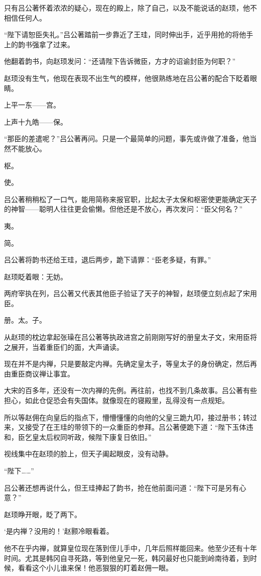 只有吕公著怀着浓浓的疑心，现在的殿上，除了自己，以及不能说话的赵顼，他不相信任何人。

“陛下请恕臣失礼。”吕公著踏前一步靠近了王珪，同时伸出手，近乎用抢的将他手上的韵书强拿了过来。

他翻着韵书，向赵顼发问：“还请陛下告诉微臣，方才的诏谕封臣为何职？”

赵顼没有生气，他现在表现不出生气的模样，他很熟练地在吕公著的配合下眨着眼睛。

上平一东——宫。

上声十九皓——保。

“那臣的差遣呢？”吕公著再问。只是一个最简单的问题，事先或许做了准备，他当然不能放心。

枢。

使。

吕公著稍稍松了一口气，能用简称来报官职，比起太子太保和枢密使更能确定天子的神智——聪明人往往更会偷懒。但他还是不放心，再次发问：“臣父何名？”

夷。

简。

吕公著将韵书还给王珪，退后两步，跪下请罪：“臣老多疑，有罪。”

赵顼眨着眼：无妨。

两府宰执在列，吕公著又代表其他臣子验证了天子的神智，赵顼便立刻点起了宋用臣。

册。太。子。

从赵顼的枕边拿起张璪在吕公著等执政进宫之前刚刚写好的册皇太子文，宋用臣将之展开，当着重臣们的面，大声诵读。

现在并不是内禅，只是要敲定内禅。先确定皇太子，等皇太子的身份确定，然后再由重臣商议禅让事宜。

大宋的百多年，还没有一次内禅的先例。再往前，也找不到几条故事。吕公著有些担心，如此仓促恐会有失国体。就像现在的寝殿里，乱得没有一点规矩。

所以等赵佣在向皇后的指点下，懵懵懂懂的向他的父皇三跪九叩，接过册书；转过来，又接受了在王珪的带领下的一众重臣的参拜。吕公著便跪下道：“陛下玉体违和，臣乞皇太后权同听政，候陛下康复日依旧。”

视线集中在赵顼的脸上，但天子阖起眼皮，没有动静。

“陛下……”

吕公著还想再说什么，但王珪捧起了韵书，抢在他前面问道：“陛下可是另有心意？”

赵顼睁开眼，眨了两下。

‘是内禅？没用的！’赵颢冷眼看着。

他不在乎内禅，就算皇位现在落到侄儿手中，几年后照样能回来。他至少还有十年时间。尤其是韩冈自寻死路，等到他皇兄一死，韩冈最好也只能到岭南待着，到时候，看看这个小儿谁来保！他恶狠狠的盯着赵佣一眼。

